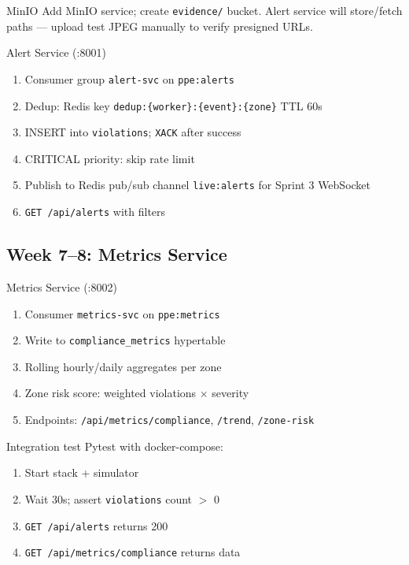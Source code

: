 \documentclass[12pt,a4paper]{report}
\begin{document}
\begin{stepbox}{MinIO}
Add MinIO service; create \texttt{evidence/} bucket. Alert service will store/fetch paths --- upload test JPEG manually to verify presigned URLs.
\end{stepbox}

\begin{stepbox}{Alert Service (:8001)}
\begin{enumerate}
    \item Consumer group \texttt{alert-svc} on \texttt{ppe:alerts}
    \item Dedup: Redis key \texttt{dedup:\{worker\}:\{event\}:\{zone\}} TTL 60s
    \item INSERT into \texttt{violations}; \texttt{XACK} after success
    \item CRITICAL priority: skip rate limit
    \item Publish to Redis pub/sub channel \texttt{live:alerts} for Sprint 3 WebSocket
    \item \texttt{GET /api/alerts} with filters
\end{enumerate}
\end{stepbox}

\subsection{Week 7--8: Metrics Service}

\begin{stepbox}{Metrics Service (:8002)}
\begin{enumerate}
    \item Consumer \texttt{metrics-svc} on \texttt{ppe:metrics}
    \item Write to \texttt{compliance\_metrics} hypertable
    \item Rolling hourly/daily aggregates per zone
    \item Zone risk score: weighted violations $\times$ severity
    \item Endpoints: \texttt{/api/metrics/compliance}, \texttt{/trend}, \texttt{/zone-risk}
\end{enumerate}
\end{stepbox}

\begin{stepbox}{Integration test}
Pytest with docker-compose:
\begin{enumerate}
    \item Start stack + simulator
    \item Wait 30s; assert \texttt{violations} count $>$ 0
    \item \texttt{GET /api/alerts} returns 200
    \item \texttt{GET /api/metrics/compliance} returns data
\end{enumerate}
\end{stepbox}
\end{document}
